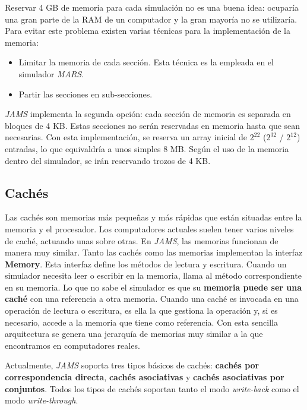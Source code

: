 \noindent Reservar 4 GB de memoria para cada simulación no es una buena idea:
ocuparía una gran parte de la RAM de un computador y la gran mayoría no se utilizaría.
Para evitar este problema existen varias técnicas para la
implementación de la memoria:
\begin{itemize}
    \item Limitar la memoria de cada sección.
    Esta técnica es la empleada en el simulador \textit{MARS}.
    \item Partir las secciones en sub-secciones.
\end{itemize}

\noindent \textit{JAMS} implementa la segunda opción:
cada sección de memoria es separada en bloques de 4 KB.
Estas secciones no serán reservadas en memoria
hasta que sean necesarias.
Con esta implementación, se reserva un array inicial de
$2^{22}$ ($2^{32}$ / $2^{12}$) entradas, lo que equivaldría
a unos simples 8 MB\@.
Según el uso de la memoria dentro del simulador,
se irán reservando trozos de 4 KB\@.

\subsection{Cachés}\label{subsec:caches}

Las cachés son memorias más pequeñas y más rápidas que están
situadas entre la memoria y el procesador.
Los computadores actuales suelen tener varios niveles de caché,
actuando unas sobre otras.
En \textit{JAMS}, las memorias funcionan de manera muy similar.
Tanto las cachés como las memorias implementan la interfaz \textbf{Memory}.
Esta interfaz define los métodos de lectura y escritura.
Cuando un simulador necesita leer o escribir en la memoria,
llama al método correspondiente en su memoria.
Lo que no sabe el simulador es que su \textbf{memoria puede ser una caché}
con una referencia a otra memoria.
Cuando una caché es invocada en una operación de lectura o escritura,
es ella la que gestiona la operación y,
si es necesario, accede a la memoria que tiene como referencia.
Con esta sencilla arquitectura se genera una jerarquía de memorias
muy similar a la que encontramos en computadores reales.

\noindent Actualmente, \textit{JAMS} soporta tres tipos básicos
de cachés: \textbf{cachés por correspondencia directa},
\textbf{cachés asociativas} y \textbf{cachés asociativas por conjuntos}.
Todos los tipos de cachés soportan tanto el modo \textit{write-back}
como el modo \textit{write-through}.

